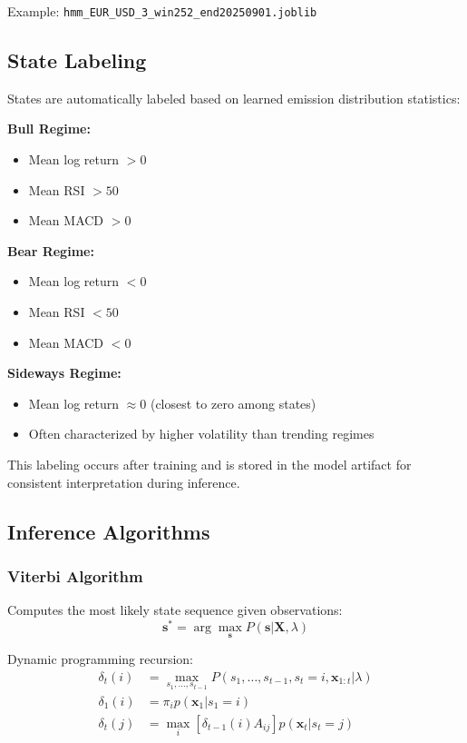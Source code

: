 \documentclass[conference]{IEEEtran}
\begin{document}
Example: \texttt{hmm\_EUR\_USD\_3\_win252\_end20250901.joblib}

\subsection{State Labeling}

States are automatically labeled based on learned emission distribution statistics:

\textbf{Bull Regime:}
\begin{itemize}
\item Mean log return $> 0$
\item Mean RSI $> 50$
\item Mean MACD $> 0$
\end{itemize}

\textbf{Bear Regime:}
\begin{itemize}
\item Mean log return $< 0$
\item Mean RSI $< 50$
\item Mean MACD $< 0$
\end{itemize}

\textbf{Sideways Regime:}
\begin{itemize}
\item Mean log return $\approx 0$ (closest to zero among states)
\item Often characterized by higher volatility than trending regimes
\end{itemize}

This labeling occurs after training and is stored in the model artifact for consistent interpretation during inference.

\subsection{Inference Algorithms}

\subsubsection{Viterbi Algorithm}
Computes the most likely state sequence given observations:
\begin{equation}
\mathbf{s}^* = \arg\max_{\mathbf{s}} P(\mathbf{s} | \mathbf{X}, \lambda)
\end{equation}

Dynamic programming recursion:
\begin{align}
\delta_t(i) &= \max_{s_1, \ldots, s_{t-1}} P(s_1, \ldots, s_{t-1}, s_t=i, \mathbf{x}_{1:t} | \lambda) \\
\delta_1(i) &= \pi_i p(\mathbf{x}_1 | s_1=i) \\
\delta_t(j) &= \max_{i}\left[\delta_{t-1}(i)A_{ij}\right] p(\mathbf{x}_t | s_t=j)
\end{align}
\end{document}
